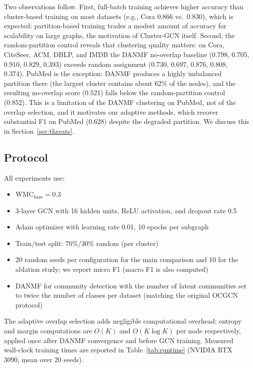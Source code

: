 \documentclass[a4paper,11pt,oneside,onecolumn,preprint]{elsarticle}
\numberwithin{equation}{section}
\begin{document}
Two observations follow. First, full-batch training achieves higher accuracy than cluster-based training on most datasets (e.g., Cora 0.866 vs.\ 0.830), which is expected: partition-based training trades a modest amount of accuracy for scalability on large graphs, the motivation of Cluster-GCN itself. Second, the random-partition control reveals that clustering quality matters: on Cora, CiteSeer, ACM, DBLP, and IMDB the DANMF no-overlap baseline (0.798, 0.705, 0.910, 0.829, 0.393) exceeds random assignment (0.730, 0.697, 0.876, 0.808, 0.374). PubMed is the exception: DANMF produces a highly imbalanced partition there (the largest cluster contains about 62\% of the nodes), and the resulting no-overlap score (0.521) falls below the random-partition control (0.852). This is a limitation of the DANMF clustering on PubMed, not of the overlap selection, and it motivates our adaptive methods, which recover substantial F1 on PubMed (0.628) despite the degraded partition. We discuss this in Section~\ref{sec:threats}.

\subsection{Protocol}
\label{subsec:protocol}

All experiments use:
\begin{itemize}
  \item $\mathrm{WMC}_{\mathrm{base}} = 0.3$
  \item 3-layer GCN with 16 hidden units, ReLU activation, and dropout rate 0.5
  \item Adam optimizer with learning rate 0.01, 10 epochs per subgraph
  \item Train/test split: 70\%/30\% random (per cluster)
  \item 20 random seeds per configuration for the main comparison and 10 for the ablation study; we report micro F1 (macro F1 is also computed)
  \item DANMF for community detection with the number of latent communities set to twice the number of classes per dataset (matching the original OCGCN protocol)
\end{itemize}

The adaptive overlap selection adds negligible computational overhead: entropy and margin computations are $O(K)$ and $O(K \log K)$ per node respectively, applied once after DANMF convergence and before GCN training.
Measured wall-clock training times are reported in Table~\ref{tab:runtime} (NVIDIA RTX 3090, mean over 20 seeds).
\end{document}
